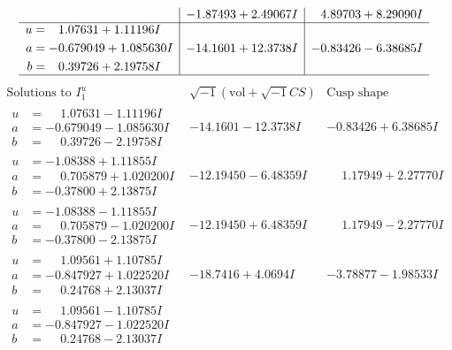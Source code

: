 \documentclass[1p]{elsarticle_modified}
\theoremstyle{definition}
\newcommand{\I}{\sqrt{-1}}
\begin{document}
$$\begin{array}{c|c|c}
 & -1.87493 + 2.49067 I & \phantom{-}4.89703 + 8.29090 I \\ \hline\begin{aligned}
u &= \phantom{-}1.07631 + 1.11196 I \\
a &= -0.679049 + 1.085630 I \\
b &= \phantom{-}0.39726 + 2.19758 I\end{aligned}
 & -14.1601 + 12.3738 I & -0.83426 - 6.38685 I\\
 \hline 
 \end{array}$$\newpage$$\begin{array}{c|c|c}  
\text{Solutions to }I^u_{1}& \I (\text{vol} + \sqrt{-1}CS) & \text{Cusp shape}\\
 \hline 
\begin{aligned}
u &= \phantom{-}1.07631 - 1.11196 I \\
a &= -0.679049 - 1.085630 I \\
b &= \phantom{-}0.39726 - 2.19758 I\end{aligned}
 & -14.1601 - 12.3738 I & -0.83426 + 6.38685 I \\ \hline\begin{aligned}
u &= -1.08388 + 1.11855 I \\
a &= \phantom{-}0.705879 + 1.020200 I \\
b &= -0.37800 + 2.13875 I\end{aligned}
 & -12.19450 - 6.48359 I & \phantom{-}1.17949 + 2.27770 I \\ \hline\begin{aligned}
u &= -1.08388 - 1.11855 I \\
a &= \phantom{-}0.705879 - 1.020200 I \\
b &= -0.37800 - 2.13875 I\end{aligned}
 & -12.19450 + 6.48359 I & \phantom{-}1.17949 - 2.27770 I \\ \hline\begin{aligned}
u &= \phantom{-}1.09561 + 1.10785 I \\
a &= -0.847927 + 1.022520 I \\
b &= \phantom{-}0.24768 + 2.13037 I\end{aligned}
 & -18.7416 + 4.0694 I & -3.78877 - 1.98533 I \\ \hline\begin{aligned}
u &= \phantom{-}1.09561 - 1.10785 I \\
a &= -0.847927 - 1.022520 I \\
b &= \phantom{-}0.24768 - 2.13037 I\end{aligned}

\end{array}$$
\end{document}
